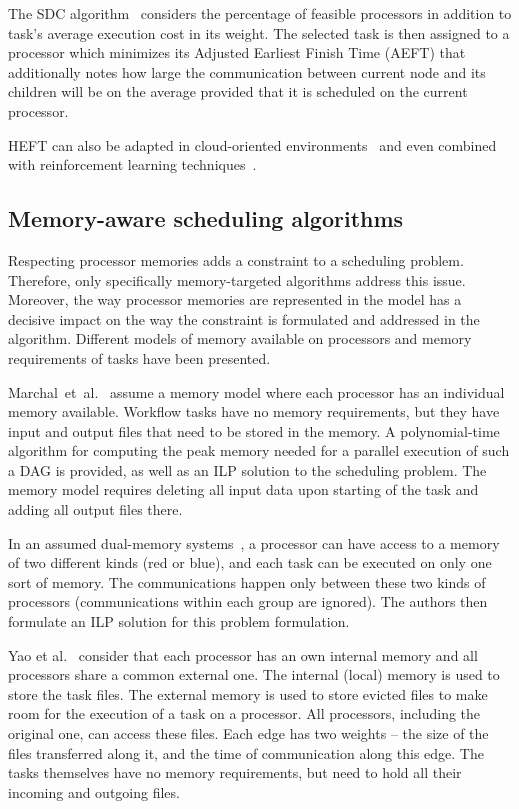 \documentclass[conference]{IEEEtran}
\begin{document}
    The SDC algorithm~\cite{SHI2006665} considers the percentage of feasible processors in addition to task’s
    average execution cost in its weight.
    The selected task is then assigned to a processor which minimizes its Adjusted Earliest Finish Time (AEFT) that
    additionally notes how large the communication between current node and its children will be on the
    average provided that it is scheduled on the current processor.


    HEFT  can also be adapted in cloud-oriented environments~\cite{samadi2018eheft} and even combined with reinforcement learning techniques~\cite{yano2022cqga}.

    \subsection{Memory-aware scheduling algorithms}
    Respecting processor memories adds a constraint to a scheduling problem.
    Therefore, only specifically memory-targeted algorithms address this issue.
    Moreover, the way processor memories are represented in the model has a decisive impact on the way the constraint
    is formulated and addressed in the algorithm.
%
    Different models of memory available on processors and memory requirements of tasks have been presented.

    Marchal~et~al.~\cite{marchal2018parallel} assume a memory model where each processor has an individual memory available.
    Workflow tasks have no memory requirements, but they have input and output files that need to be stored in the memory.
    A polynomial-time algorithm for computing the peak memory needed for a parallel execution of such a DAG is provided,
    as well as an ILP solution to the scheduling problem.
    The memory model requires deleting all input data upon starting of the task and adding all output files there.

    In an assumed dual-memory systems~\cite{herrmann2014memory},  a processor can have access 
    to a memory of two different
    kinds (red or blue), and each task can be executed on only one sort of memory.
    The communications happen only between these two kinds of processors (communications within 
    each group are ignored).
    The authors then formulate an ILP solution for this problem formulation.

    Yao et al.~\cite{yao2022memory} consider that each processor has an own internal memory and all
    processors share a common external one. The internal (local) memory is used to store the task files.
    The external memory is used to store evicted files to make room for the execution of a task on a processor.
    All processors, including the original one, can access these files. 
    Each edge %
    has two weights -- the size of the files transferred along it,
    and the time of communication along this edge.
    The tasks themselves have no memory requirements, but need to hold all their incoming and outgoing files.
\end{document}
